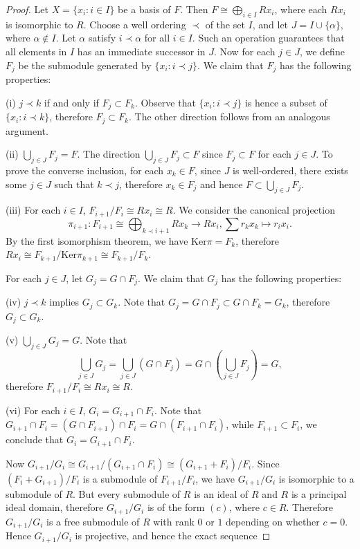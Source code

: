\begin{proof}
Let $X=\{x_i:i\in I\}$ be a basis of $F$. Then $F\cong\bigoplus_{i\in I}Rx_i$, where each $Rx_i$ is isomorphic to $R$. Choose a well ordering $\prec$ of the set $I$, and let $J=I\cup\{\alpha\}$, where $\alpha\notin I$. Let $\alpha$ satisfy $i\prec\alpha$ for all $i\in I$. Such an operation guarantees that all elements in $I$ has an immediate successor in $J$. Now for each $j\in J$, we define $F_j$ be the submodule generated by $\{x_i:i\prec j\}$. We claim that $F_j$ has the following properties:\par
(i) $j\prec k$ if and only if $F_j\subset F_k$. Observe that $\{x_i:i\prec j\}$ is hence a subset of $\{x_i:i\prec k\}$, therefore $F_j\subset F_k$. The other direction follows from an analogous argument.\par
(ii) $\bigcup_{j\in J}F_j=F$. The direction $\bigcup_{j\in J}F_j\subset F$ since $F_j\subset F$ for each $j\in J$. To prove the converse inclusion, for each $x_k\in F$, since $J$ is well-ordered, there exists some $j\in J$ such that $k\prec j$, therefore $x_k\in F_j$ and hence $F\subset\bigcup_{j\in J}F_j$.\par
(iii) For each $i\in I$, $F_{i+1}/F_i\cong Rx_i\cong R$. We consider the canonical projection 
$$
\pi _{i+1}:F_{i+1}\cong \bigoplus_{k\prec i+1}{Rx_k}\rightarrow Rx_i,\sum{r_kx_k}\mapsto r_ix_i.
$$
By the first isomorphism theorem, we have $\mathrm{Ker}\pi=F_k$, therefore $Rx_i\cong F_{k+1}/\mathrm{Ker}\pi _{k+1}\cong F_{k+1}/F_k$.\par
For each $j\in J$, let $G_j=G\cap F_j$. We claim that $G_j$ has the following properties: \par
(iv) $j\prec k$ implies $G_j\subset G_k$. Note that $G_j=G\cap F_j\subset G\cap F_k=G_k$, therefore $G_j\subset G_k$.\par
(v) $\bigcup_{j\in J}G_j=G$. Note that 
$$
\bigcup_{j\in J}{G_j}=\bigcup_{j\in J}{\left( G\cap F_j \right)}=G\cap \left( \bigcup_{j\in J}{F_j} \right) =G,
$$
therefore $F_{i+1}/F_i\cong Rx_i\cong R$.\par
(vi) For each $i\in I$, $G_i=G_{i+1}\cap F_i$. Note that $G_{i+1}\cap F_i=\left( G\cap F_{i+1} \right) \cap F_i=G\cap \left( F_{i+1}\cap F_i \right) $, while $F_{i+1}\subset F_i$, we conclude that $G_i=G_{i+1}\cap F_i$.\par
Now $G_{i+1}/G_i\cong G_{i+1}/\left( G_{i+1}\cap F_i \right) \cong \left( G_{i+1}+F_i \right) /F_i$. Since $(F_i+G_{i+1})/F_i$ is a submodule of $F_{i+1}/F_i$, we have $G_{i+1}/G_i$ is isomorphic to a submodule of $R$. But every submodule of $R$ is an ideal of $R$ and $R$ is a principal ideal domain, therefore $G_{i+1}/G_i$ is of the form $(c)$, where $c\in R$. Therefore $G_{i+1}/G_i$ is a free submodule of $R$ with rank $0$ or $1$ depending on whether $c=0$. Hence $G_{i+1}/G_i$ is projective, and hence the exact sequence 

\end{proof}
